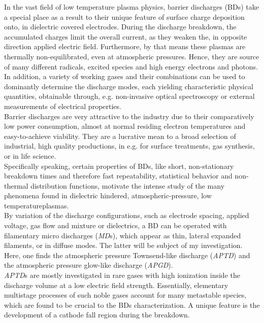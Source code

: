 \documentclass[a4paper,10pt,twoside]{article}
\newcommand{\tilt}[1]{\textit{#1}}
\begin{document}
		In the vast field of low temperature plasma physics, barrier discharges (BDs) take a special place as a result to their unique feature of surface charge deposition onto, in dielectric covered electrodes. During the discharge breakdown, the accumulated charges limit the overall current, as they weaken the, in opposite direction applied electric field. Furthermore, by that means these plasmas are thermally non-equilibrated, even at atmospheric pressures. Hence, they are source of many different radicals, excited species and high energy electrons and photons. In addition, a variety of working gases and their combinations can be used to dominantly determine the discharge modes, each yielding characteristic physical quantities, obtainable through, e.g. non-invasive optical spectroscopy or external measurements of electrical properties.\\ 
		Barrier discharges are very attractive to the industry due to their comparatively low power consumption, almost at normal residing electron temperatures and easy-to-achieve viability. They are a lucrative mean to a broad selection of industrial, high quality productions, in e.g. for surface treatments, gas synthesis, or in life science.\\
		Specifically speaking, certain properties of BDs, like short, non-stationary breakdown times and therefore fast repeatability, statistical behavior and non-thermal distribution functions, motivate the intense study of the many phenomena found in dielectric hindered, atmospheric-pressure, low temperature\linebreak plasmas.\\
		By variation of the discharge configurations, such as electrode spacing, applied voltage, gas flow and mixture or dielectrics, a BD can be operated with filamentary micro discharges (\tilt{MD}s), which appear as thin, lateral expanded filaments, or in diffuse modes. The latter will be subject of my investigation. Here, one finds the atmospheric pressure Townsend-like discharge (\tilt{APTD}) and the atmospheric pressure glow-like discharge (\tilt{APGD}).\\
		\tilt{APTD}s are mostly investigated in rare gases with high ionization inside the discharge volume at a low electric field strength. Essentially, elementary multistage processes of such noble gases account for many metastable species, which are found to be crucial to the BDs characterization. A unique feature is the development of a cathode fall region during the breakdown.\\
\end{document}
